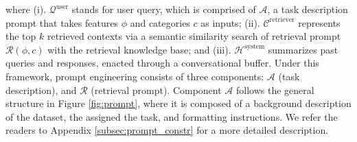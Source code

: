 where (i). $\mathcal{Q}^{\text{user}}$ stands for user query, which is comprised of $\mathcal{A}$, a task description prompt that takes features $\phi$ and categories $c$ as inputs; (ii). $\mathcal{C}^{\text{retriever}}$ represents the top $k$ retrieved contexts via a semantic similarity search of retrieval prompt $\mathcal{R}(\phi,c)$ with the retrieval knowledge base; and (iii). $\mathcal{H}^{\text{system}}$ summarizes past queries and responses, enacted through a conversational buffer. Under this framework, prompt engineering consists of three components: $\mathcal{A}$ (task description), and $\mathcal{R}$ (retrieval prompt). Component $\mathcal{A}$ follows the general structure in Figure \ref{fig:prompt}, where it is composed of a background description of the dataset, the assigned the task, and formatting instructions. We refer the readers to Appendix \ref{subsec:prompt_constr} for a more detailed description.




